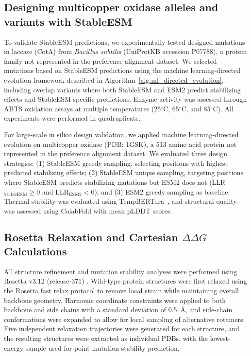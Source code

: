 \subsection{Designing multicopper oxidase alleles and variants with StableESM}\label{sec:oxidase_design}
To validate StableESM predictions, we experimentally tested designed mutations in laccase (CotA) from \textit{Bacillus subtilis} (UniProtKB accession P07788), a protein family not represented in the preference alignment dataset. We selected mutations based on StableESM predictions using the machine learning-directed evolution framework described in Algorithm~\ref{alg:ml_directed_evolution}, including overlap variants where both StableESM and ESM2 predict stabilizing effects and StableESM-specific predictions. Enzyme activity was assessed through ABTS oxidation assays at multiple temperatures (25$^\circ$C, 65$^\circ$C, and 85$^\circ$C). All experiments were performed in quadruplicate.

For large-scale in silico design validation, we applied machine learning-directed evolution on multicopper oxidase (PDB: 1GSK), a 513 amino acid protein not represented in the preference alignment dataset. We evaluated three design strategies: (1) StableESM greedy sampling, selecting positions with highest predicted stabilizing effects; (2) StableESM unique sampling, targeting positions where StableESM predicts stabilizing mutations but ESM2 does not (LLR$_{\text{StableESM}} \geq 0$ and LLR$_{\text{ESM2}} < 0$); and (3) ESM2 greedy sampling as baseline. Thermal stability was evaluated using TempBERTura~\citep{rodella2024temberture}, and structural quality was assessed using ColabFold with mean pLDDT scores.

\subsection{Rosetta Relaxation and Cartesian $\Delta\Delta G$ Calculations}\label{sec:rosetta_methods}

All structure refinement and mutation stability analyses were performed using Rosetta v3.12 (release-371) \citep{alford2017rosetta,leman2020macromolecular,fleishman2011rosettascripts,LEAVERFAY2011545}. Wild-type protein structures were first relaxed using the Rosetta fast relax protocol to remove local strain while maintaining overall backbone geometry. Harmonic coordinate constraints were applied to both backbone and side chains with a standard deviation of 0.5~\AA, and side-chain conformations were expanded to allow for local sampling of alternative rotamers. Five independent relaxation trajectories were generated for each structure, and the resulting structures were extracted as individual PDBs, with the lowest-energy sample used for point mutation stability prediction. \\ 

